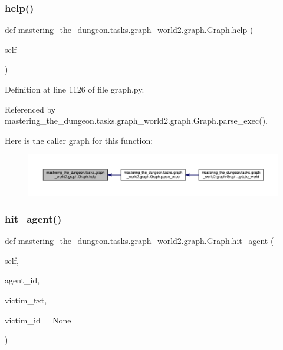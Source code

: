 \subsubsection{\texorpdfstring{help()}{help()}}
{\footnotesize\ttfamily def mastering\+\_\+the\+\_\+dungeon.\+tasks.\+graph\+\_\+world2.\+graph.\+Graph.\+help (\begin{DoxyParamCaption}\item[{}]{self }\end{DoxyParamCaption})}



Definition at line 1126 of file graph.\+py.



Referenced by mastering\+\_\+the\+\_\+dungeon.\+tasks.\+graph\+\_\+world2.\+graph.\+Graph.\+parse\+\_\+exec().

Here is the caller graph for this function\+:
\nopagebreak
\begin{figure}[H]
\begin{center}
\leavevmode
\includegraphics[width=350pt]{classmastering__the__dungeon_1_1tasks_1_1graph__world2_1_1graph_1_1Graph_a1a09e41d73b4ddb7052ac6c4f29ba6ed_icgraph}
\end{center}
\end{figure}
\mbox{\label{classmastering__the__dungeon_1_1tasks_1_1graph__world2_1_1graph_1_1Graph_a044b163ff53309b39883977585ae7434}} 
\subsubsection{\texorpdfstring{hit\+\_\+agent()}{hit\_agent()}}
{\footnotesize\ttfamily def mastering\+\_\+the\+\_\+dungeon.\+tasks.\+graph\+\_\+world2.\+graph.\+Graph.\+hit\+\_\+agent (\begin{DoxyParamCaption}\item[{}]{self,  }\item[{}]{agent\+\_\+id,  }\item[{}]{victim\+\_\+txt,  }\item[{}]{victim\+\_\+id = {\ttfamily None} }\end{DoxyParamCaption})}



